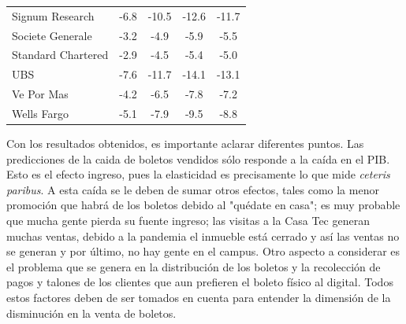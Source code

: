 \begin{table}[H]
{\begin{tabular}{l|c|ccc}
Signum Research                  & -6.8            & -10.5           & -12.6          & -11.7          \\
Societe Generale                 & -3.2            & -4.9            & -5.9           & -5.5           \\
Standard Chartered               & -2.9            & -4.5            & -5.4           & -5.0           \\
UBS                              & -7.6            & -11.7           & -14.1          & -13.1          \\
Ve Por Mas                       & -4.2            & -6.5            & -7.8           & -7.2           \\
Wells Fargo                      & -5.1            & -7.9            & -9.5           & -8.8           \\ \hline
\end{tabular}
}
\end{table}

\newpage

Con los resultados obtenidos, es importante aclarar diferentes puntos. Las predicciones de la caida de boletos vendidos sólo responde a la caída en el PIB. Esto es el efecto ingreso, pues la elasticidad es precisamente lo que mide \textit{ceteris paribus}. A esta caída se le deben de sumar otros efectos, tales como la menor promoción que habrá de los boletos debido al "quédate en casa"; es muy probable que mucha gente pierda su fuente ingreso; las visitas a la Casa Tec generan muchas ventas, debido a la pandemia el inmueble está cerrado y así las ventas no se generan y por último, no hay gente en el campus. Otro aspecto a considerar es el problema que se genera en la distribución de los boletos y la recolección de pagos y talones de los clientes que aun prefieren el boleto físico al digital. Todos estos factores deben de ser tomados en cuenta para entender la dimensión de la disminución en la venta de boletos. 